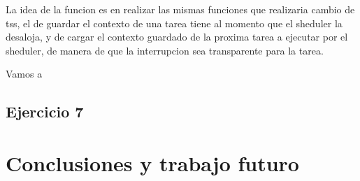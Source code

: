 \documentclass[a4paper]{article}
\begin{document}
La idea de la funcion es en realizar las mismas funciones que realizaria cambio de  tss, el de guardar el contexto de una tarea tiene al momento que el sheduler la desaloja, y de cargar el contexto guardado de la proxima tarea a  ejecutar por el sheduler, de manera de que la interrupcion sea transparente para la tarea. 

Vamos a



	 

   

\subsection{Ejercicio 7}





\section{Conclusiones y trabajo futuro}
\end{document}
